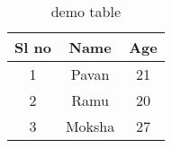\documentclass{article}
\begin{document}
	\begin{table}
		\centering
	\huge	\begin{tabular}{|c|c|c|}
			\hline
			
			
		Sl no & Name & Age\\
			\hline
		     1 & Pavan & 21\\
			 2 & Ramu & 20\\
			 3 & Moksha & 27\\
			\hline
			\end{tabular}
		\caption{demo table}
		\label{fig:tab}
	
	
	\end{table}
\end{document}
